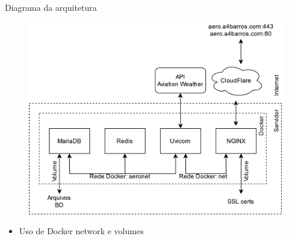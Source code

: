 \documentclass{beamer}
\begin{document}
\begin{frame}{Diagrama da arquitetura}
    \begin{figure}[ht]
        \begin{center}
        \includegraphics[width=0.65\linewidth]{img/arquitetura.png}
        \label{fig:arquitetura}
        \end{center}
    \end{figure}
    \begin{itemize}
        \item Uso de Docker network e volumes
    \end{itemize}
\end{frame}
\end{document}
